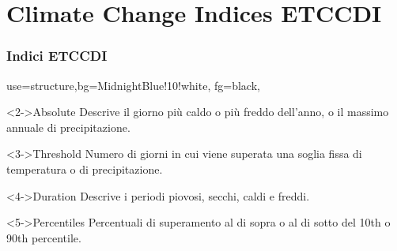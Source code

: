 \documentclass[14pt,usenames,dvipsnames]{beamer}
\begin{document}

\section{Climate Change Indices ETCCDI}
%

\begin{frame}
  \frametitle{Indici ETCCDI}
   {use=structure,bg=MidnightBlue!10!white, fg=black,}

	  \begin{block}<2->{Absolute}
	  Descrive il giorno più caldo o più freddo dell'anno, o il massimo annuale di precipitazione.
	\end{block}


	\begin{block}<3->{Threshold}
    Numero di giorni in cui viene superata una soglia fissa di temperatura o di precipitazione.
  \end{block}


	\begin{block}<4->{Duration}
	 Descrive i periodi piovosi, secchi, caldi e freddi.
  \end{block}
  
    \begin{block}<5->{Percentiles}
     Percentuali di superamento al di sopra o al di sotto del 10th o 90th percentile. 
  \end{block}
  
  
\end{frame}


%
\end{document}
